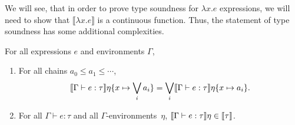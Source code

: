 We will see, that in order to prove type soundness for $\lambda x.e$ expressions, we will need to show that 
$\llbracket \lambda x.e \rrbracket$ is a continuous function. Thus, the statement of type soundness has some additional
complexities.

\begin{thm} 
For all expressions $e$ and environments $\Gamma$,
\begin{enumerate}
\item For all chains $a_0\leq a_1\leq\dotsb$,
\begin{align*}
\llbracket{{\Gamma}\vdash{e}:{\tau}}\rrbracket{\eta\{{x}\mapsto{\bigvee_i a_i}\}} =
\bigvee_i\llbracket{{\Gamma}\vdash{e}:{\tau}}\rrbracket{\eta\{{x}\mapsto{a_i}\}}.
\end{align*}
\item For all $\Gamma\vdash e : \tau$ and all $\Gamma$-environments~$\eta$,
$\llbracket{{\Gamma}\vdash{e}:{\tau}}\rrbracket{\eta}\in\llbracket{\tau}\rrbracket$.
\end{enumerate}
\end{thm}

